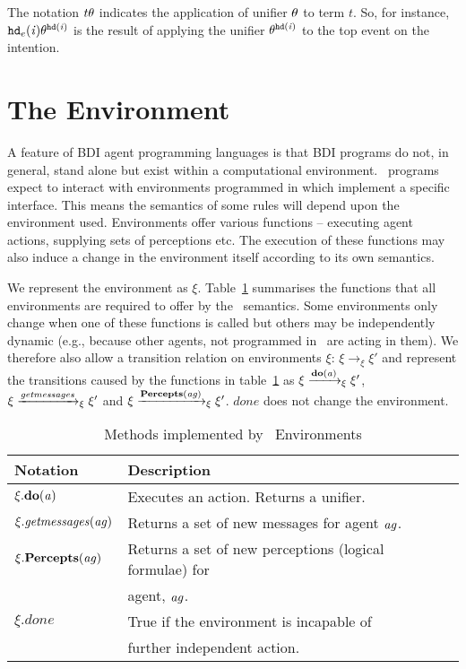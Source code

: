 The
notation $t\theta$ indicates the application of unifier
$\theta$ to term $t$.  So, for instance, 
${\tt hd}_e(\mathit{i})\theta^{{\tt hd}(\mathit{i})}$ is
the result of applying the unifier
$\theta^{{\tt hd}(\mathit{i})}$ to the top event on the intention.


\section{The Environment}
\label{sec:environment}

A feature of BDI agent programming languages is that BDI programs do not, in general, stand alone but exist within a computational environment.  \gwendolen\ programs expect to interact with environments programmed in \java which implement a specific interface.
This means the semantics of some rules will
depend upon the environment used.  Environments offer various functions -- executing agent actions, supplying sets of perceptions etc.  The execution of these functions may also induce a change in the environment itself according to its own semantics.

We represent the environment as $\xi$.  Table~\ref{table:env} summarises the functions that all environments are required to offer by the \gwendolen\ semantics.  Some environments only change when one of these functions is called but others may be independently dynamic (e.g., because other agents, not programmed in \gwendolen\ are acting in them).  We therefore also allow a transition relation on environments $\xi$: $\xi \rightarrow_{\xi} \xi'$  and represent the transitions caused by the functions in table~\ref{table:env} as $\xi \xrightarrow{\mathrm{\mathbf{do}}(\mathit{a})}_{\xi} \xi'$, $\xi \xrightarrow{\mathit{getmessages}}_{\xi} \xi'$ and $\xi \xrightarrow{\mathbf{Percepts}(\mathit{ag})}_{\xi} \xi'$.  $done$ does not change the environment.

\begin{table}
\begin{tabular}{llp{5cm}}
Notation &  Description \\ \hline
$\xi.\mathrm{\mathbf{do}}(\mathit{a})$ & 
Executes an action.  Returns a unifier.\index{action} \\

$\xi.\mathit{getmessages}(\mathit{ag})$  & Returns a set of 
new messages for agent $\mathit{ag}$.\index{message} \\

$\xi.\mathbf{Percepts}(\mathit{ag})$ & Returns a set of new perceptions (logical formulae) for \\
& agent, $\mathit{ag}$.\index{perception}\\

$\xi.done$ & True if the environment is incapable of \\
 & further independent action. \\

\end{tabular}
\caption{Methods implemented by \gwendolen\ Environments}
\label{table:env}
\end{table}


